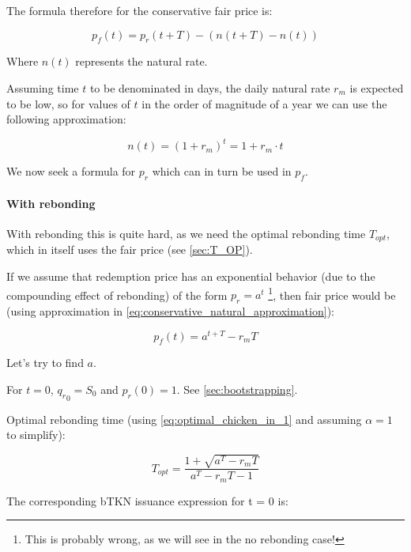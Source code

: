 \documentclass{article}
\begin{document}
The formula therefore for the conservative fair price is:

\begin{equation}
  \label{eq:conservative-1}
p_f(t) = p_r(t + T) - (n(t+T) - n(t))
\end{equation}

Where $n(t)$ represents the natural rate.

Assuming time $t$ to be denominated in days, the daily natural rate $r_m$ is expected to be low, so for values of $t$ in the order of magnitude of a year we can use the following approximation:

\begin{equation}
  \label{eq:conservative_natural_approximation}
n(t) = (1 + r_m)^t = 1 + r_m \cdot t
\end{equation}

We now seek a formula for $p_r$ which can in turn be used in $p_f$. 

\paragraph{With rebonding}
With rebonding this is quite hard, as we need the optimal rebonding time $T_{opt}$, which in itself uses the fair price (see \ref{sec:T_OP}).

If we assume that redemption price has an exponential behavior (due to the compounding effect of rebonding) of the form $p_r = a^t$ \footnote{This is probably wrong, as we will see in the no rebonding case!}, then fair price would be (using approximation in \ref{eq:conservative_natural_approximation}):

\begin{equation}
  \label{eq:conservative-2}
p_f(t) = a^{t+T} - r_m T
\end{equation}

Let’s try to find $a$.

For $t=0$, ${q_r}_0 = S_0$ and $p_r(0) = 1$. See \ref{sec:bootstrapping}.

Optimal rebonding time (using \ref{eq:optimal_chicken_in_1} and assuming $\alpha = 1$ to simplify):

\begin{equation}
  \label{eq:conservative_T_OP}
T_{opt} = \frac{1+ \sqrt{a^T - r_mT}}{a^T - r_mT - 1}
\end{equation}

The corresponding bTKN issuance expression for t = 0 is:
\end{document}
